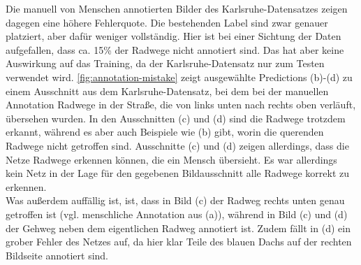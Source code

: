 Die manuell von Menschen annotierten Bilder des Karlsruhe-Datensatzes zeigen dagegen eine höhere 
Fehlerquote. Die bestehenden Label sind zwar genauer platziert, aber dafür weniger vollständig. 
Hier ist bei einer Sichtung der Daten aufgefallen, dass ca. 15\% der Radwege nicht annotiert sind. 
Das hat aber keine Auswirkung auf das Training, da der Karlsruhe-Datensatz nur zum Testen verwendet wird.
\autoref{fig:annotation-mistake} zeigt ausgewählte Predictions (b)-(d) 
zu einem Ausschnitt aus dem Karlsruhe-Datensatz, bei dem bei der manuellen Annotation 
Radwege in der Straße, die von links unten nach rechts oben verläuft, übersehen wurden. 
In den Ausschnitten (c) und (d) sind die Radwege trotzdem erkannt, während es aber auch 
Beispiele wie (b) gibt, worin die querenden Radwege nicht getroffen sind. Ausschnitte (c) 
und (d) zeigen allerdings, dass die Netze Radwege erkennen können, die ein Mensch übersieht.
Es war allerdings kein Netz in der Lage für den gegebenen Bildausschnitt alle Radwege korrekt 
zu erkennen. \\
Was außerdem auffällig ist, ist, dass in Bild (c) der Radweg rechts unten genau getroffen ist 
(vgl. menschliche Annotation aus (a)), während in Bild (c) und (d) der Gehweg neben dem eigentlichen 
Radweg annotiert ist. Zudem fällt in (d) ein grober Fehler des Netzes auf, da hier klar Teile des 
blauen Dachs auf der rechten Bildseite annotiert sind.

